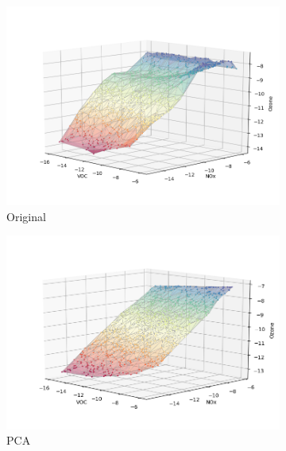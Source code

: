\begin{figure}[H]
\begin{subfigure}{.33\textwidth}
  \centering
  \includegraphics[width=\textwidth]{4fig/original.png}
  \caption{Original}  \label{fig:iorig}
\end{subfigure}%
\begin{subfigure}{.33\textwidth}
  \centering
  \includegraphics[width=\textwidth]{4fig/rpca.png}
  \caption{PCA}  \label{fig:ipca}
\end{subfigure}%
\begin{subfigure}{.33\textwidth}
  \centering

\end{subfigure}
\end{figure}
